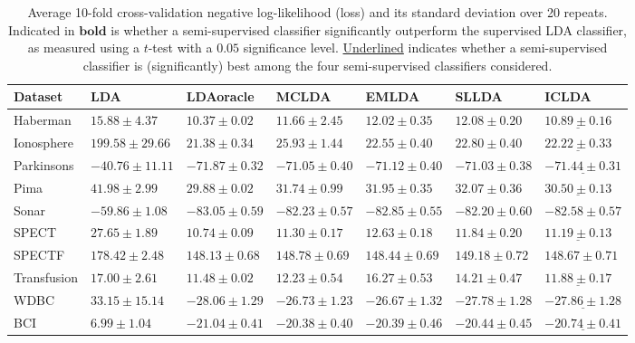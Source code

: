 \begin{table*}
\caption{Average 10-fold cross-validation negative log-likelihood (loss) and its standard deviation over 20 repeats. Indicated in $\mathbf{bold}$ is whether a semi-supervised classifier significantly outperform the supervised LDA classifier, as measured using a $t$-test with a $0.05$ significance level. \underline{Underlined} indicates whether a semi-supervised classifier is (significantly) best among the four semi-supervised classifiers considered.} \label{table:cvresults-loss}
\centering
\begin{tabular}{|l|llllll|}
\hline
Dataset & LDA & LDAoracle & MCLDA & EMLDA & SLLDA & ICLDA \\ 
\hline
Haberman & $15.88 \pm 4.37$& $10.37 \pm 0.02$& $\mathbf{11.66 \pm 2.45} $& $\mathbf{12.02 \pm 0.35} $& $\mathbf{12.08 \pm 0.20} $& $\mathbf{\underline{10.89 \pm 0.16}} $\\ 
Ionosphere & $199.58 \pm 29.66$& $21.38 \pm 0.34$& $\mathbf{25.93 \pm 1.44} $& $\mathbf{22.55 \pm 0.40} $& $\mathbf{22.80 \pm 0.40} $& $\mathbf{\underline{22.22 \pm 0.33}} $\\ 
Parkinsons & $-40.76 \pm 11.11$& $-71.87 \pm 0.32$& $\mathbf{-71.05 \pm 0.40} $& $\mathbf{-71.12 \pm 0.40} $& $\mathbf{-71.03 \pm 0.38} $& $\mathbf{\underline{-71.44 \pm 0.31}} $\\ 
Pima & $41.98 \pm 2.99$& $29.88 \pm 0.02$& $\mathbf{31.74 \pm 0.99} $& $\mathbf{31.95 \pm 0.35} $& $\mathbf{32.07 \pm 0.36} $& $\mathbf{\underline{30.50 \pm 0.13}} $\\ 
Sonar & $-59.86 \pm 1.08$& $-83.05 \pm 0.59$& $\mathbf{-82.23 \pm 0.57} $& $\mathbf{-82.85 \pm 0.55} $& $\mathbf{-82.20 \pm 0.60} $& $\mathbf{-82.58 \pm 0.57} $\\ 
SPECT & $27.65 \pm 1.89$& $10.74 \pm 0.09$& $\mathbf{11.30 \pm 0.17} $& $\mathbf{12.63 \pm 0.18} $& $\mathbf{11.84 \pm 0.20} $& $\mathbf{\underline{11.19 \pm 0.13}} $\\ 
SPECTF & $178.42 \pm 2.48$& $148.13 \pm 0.68$& $\mathbf{148.78 \pm 0.69} $& $\mathbf{148.44 \pm 0.69} $& $\mathbf{149.18 \pm 0.72} $& $\mathbf{148.67 \pm 0.71} $\\ 
Transfusion & $17.00 \pm 2.61$& $11.48 \pm 0.02$& $\mathbf{12.23 \pm 0.54} $& $16.27 \pm 0.53$& $\mathbf{14.21 \pm 0.47} $& $\mathbf{\underline{11.88 \pm 0.17}} $\\ 
WDBC & $33.15 \pm 15.14$& $-28.06 \pm 1.29$& $\mathbf{-26.73 \pm 1.23} $& $\mathbf{-26.67 \pm 1.32} $& $\mathbf{-27.78 \pm 1.28} $& $\mathbf{\underline{-27.86 \pm 1.28}} $\\ 
BCI & $6.99 \pm 1.04$& $-21.04 \pm 0.41$& $\mathbf{-20.38 \pm 0.40} $& $\mathbf{-20.39 \pm 0.46} $& $\mathbf{-20.44 \pm 0.45} $& $\mathbf{\underline{-20.74 \pm 0.41}} $\\ 
\hline
\end{tabular}
\end{table*}
